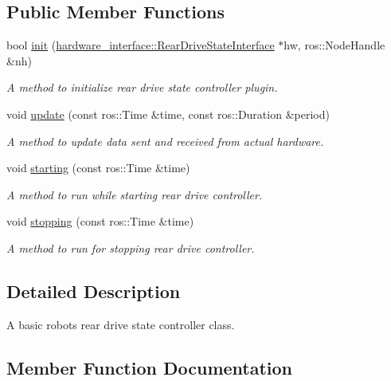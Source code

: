 \subsection*{Public Member Functions}
\begin{DoxyCompactItemize}
\item 
bool \hyperlink{classrear__drive__state__controller_1_1RearDriveStateController_a4cade2fa3f7bf52491431548ad6a3d97}{init} (\hyperlink{classhardware__interface_1_1RearDriveStateInterface}{hardware\+\_\+interface\+::\+Rear\+Drive\+State\+Interface} $\ast$hw, ros\+::\+Node\+Handle \&nh)
\begin{DoxyCompactList}\small\item\em A method to initialize rear drive state controller plugin. \end{DoxyCompactList}\item 
void \hyperlink{classrear__drive__state__controller_1_1RearDriveStateController_a5eee03357f95a146b72947ce5f277a41}{update} (const ros\+::\+Time \&time, const ros\+::\+Duration \&period)
\begin{DoxyCompactList}\small\item\em A method to update data sent and received from actual hardware. \end{DoxyCompactList}\item 
void \hyperlink{classrear__drive__state__controller_1_1RearDriveStateController_a53a87a7512f06f14c71a0bda39a7d37d}{starting} (const ros\+::\+Time \&time)
\begin{DoxyCompactList}\small\item\em A method to run while starting rear drive controller. \end{DoxyCompactList}\item 
void \hyperlink{classrear__drive__state__controller_1_1RearDriveStateController_af2618c5f4cadfde5a696aa6ad2ce6714}{stopping} (const ros\+::\+Time \&time)
\begin{DoxyCompactList}\small\item\em A method to run for stopping rear drive controller. \end{DoxyCompactList}\end{DoxyCompactItemize}


\subsection{Detailed Description}
A basic robot\textquotesingle{}s rear drive state controller class. 

\subsection{Member Function Documentation}
\mbox{\label{classrear__drive__state__controller_1_1RearDriveStateController_a4cade2fa3f7bf52491431548ad6a3d97}} 
